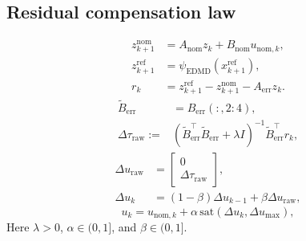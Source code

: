 \documentclass{article}
\begin{document}
\subsection{Residual compensation law}
\begin{equation}
\begin{aligned}
z_{k+1}^{\mathrm{nom}} &= A_{\mathrm{nom}}z_k + B_{\mathrm{nom}}u_{\mathrm{nom},k},\\
z_{k+1}^{\mathrm{ref}} &= \psi_{\mathrm{EDMD}}(x_{k+1}^{\mathrm{ref}}),\\
r_k &= z_{k+1}^{\mathrm{ref}} - z_{k+1}^{\mathrm{nom}} - A_{\mathrm{err}}z_k .
\end{aligned}
\label{eq:comp_residual}
\end{equation}
\begin{equation}
\begin{aligned}
\tilde{B}_{\mathrm{err}} &= B_{\mathrm{err}}(:,2{:}4),\\
\Delta\tau_{\mathrm{raw}}
:= {}&
(\tilde{B}_{\mathrm{err}}^{\top}\tilde{B}_{\mathrm{err}}+\lambda I)^{-1}
\tilde{B}_{\mathrm{err}}^{\top}r_k,
\end{aligned}
\label{eq:comp_tau}
\end{equation}
\begin{equation}
\begin{aligned}
\Delta u_{\mathrm{raw}} &=
\begin{bmatrix}
0\\
\Delta\tau_{\mathrm{raw}}
\end{bmatrix},\\
\Delta u_k &=
(1-\beta)\Delta u_{k-1}+\beta\Delta u_{\mathrm{raw}},
\end{aligned}
\label{eq:smoothing}
\end{equation}
\begin{equation}
u_k=u_{\mathrm{nom},k}+\alpha\,\mathrm{sat}(\Delta u_k,\Delta u_{\max}),
\label{eq:compensation}
\end{equation}
Here $\lambda>0$, $\alpha\in(0,1]$, and $\beta\in(0,1]$.
\end{document}
